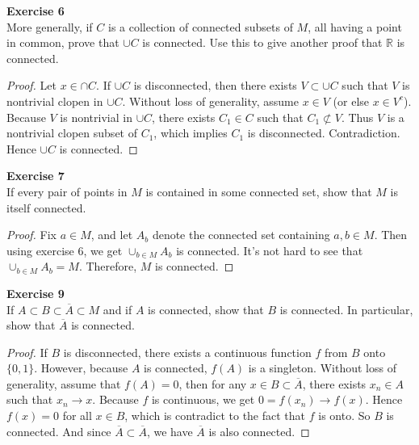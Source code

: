 \documentclass[12pt, a4paper]{article}
\theoremstyle{plain}
\newcommand{\R}{\mathbb{R}}
\newenvironment{exercise}[2][Exercise]
    { \begin{mdframed}[backgroundcolor=gray!20] \textbf{#1 #2} \\}
    {  \end{mdframed}}
\begin{document}
\begin{exercise}{6}
More generally, if $C$ is a collection of connected subsets of $M$, all having a point in common, prove that $\cup C$ is connected. Use this to give another proof that $\R$ is connected.
\end{exercise}
	\begin{proof}
	Let $x\in \cap C$. If $\cup C$ is disconnected, then there exists $V\subset \cup C$ such that $V$ is nontrivial clopen in $\cup C$. Without loss of generality, assume $x\in V$ (or else $x\in V^c$). Because $V$ is nontrivial in $\cup C$, there exists $C_1\in C$ such that $C_1\not\subset V$. Thus $V$ is a nontrivial clopen subset of $C_1$, which implies $C_1$ is disconnected. Contradiction. Hence $\cup C$ is connected.
	\end{proof}

\begin{exercise}{7}
If every pair of points in $M$ is contained in some connected set, show that $M$ is itself connected.
\end{exercise}
	\begin{proof}
	Fix $a\in M$, and let $A_{b}$ denote the connected set containing $a,b\in M$. Then using exercise 6, we get $\cup_{b\in M}A_{b}$ is connected. It's not hard to see that $\cup_{b\in M}A_{b}=M$. Therefore, $M$ is connected. 
	\end{proof}
	
\begin{exercise}{9}
If $A\subset B\subset \overline{A}\subset M$ and if $A$ is connected, show that $B$ is connected. In particular, show that $\overline{A}$ is connected.
\end{exercise}
	\begin{proof}
	If $B$ is disconnected, there exists a continuous function $f$ from $B$ onto $\{0,1\}$. However, because $A$ is connected, $f(A)$ is a singleton. Without loss of generality, assume that $f(A)=0$, then for any $x\in B\subset \overline{A}$, there exists $x_n\in A$ such that $x_n\rightarrow x$. Because $f$ is continuous, we get $0=f(x_n)\rightarrow f(x)$. Hence $f(x)=0$ for all $x\in B$, which is contradict to the fact that $f$ is onto. So $B$ is connected. And since $\overline{A}\subset\overline{A}$, we have $\overline{A}$ is also connected.
	\end{proof}

\pagebreak
\end{document}
